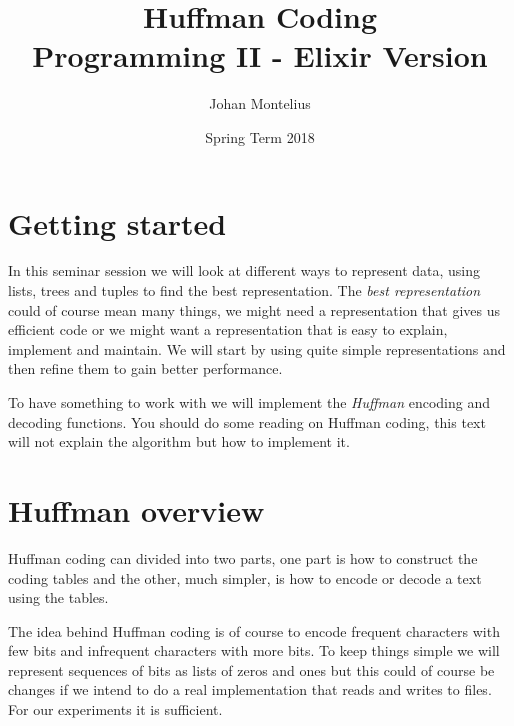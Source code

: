 \documentclass[a4paper,11pt]{article}
\begin{document}

\title{
    \textbf{Huffman Coding}\\
    \large{Programming II - Elixir Version}
}
\author{Johan Montelius}
\date{Spring Term 2018}
\maketitle
{}



\section*{Getting started}
In this seminar session we will look at different ways to represent
data, using lists, trees and tuples to find the best
representation. The {\em best representation} could of course mean
many things, we might need a representation that gives us efficient
code or we might want a representation that is easy to explain,
implement and maintain. We will start by using quite simple
representations and then refine them to gain better performance.

To have something to work with we will implement the {\em Huffman}
encoding and decoding functions. You should do some reading on Huffman
coding, this text will not explain the algorithm but how to implement it.



\section{Huffman overview}
Huffman coding can divided into two parts, one part is how to
construct the coding tables and the other, much simpler, is how to
encode or decode a text using the tables. 

The idea behind Huffman coding is of course to encode frequent
characters with few bits and infrequent characters with more bits. To
keep things simple we will represent sequences of bits as lists of
zeros and ones but this could of course be changes if we intend to do a
real implementation that reads and writes to files. For our
experiments it is sufficient.
\end{document}
